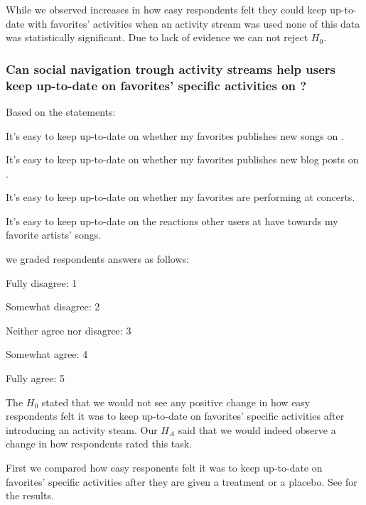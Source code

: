 \parabreak

While we observed increases in how easy respondents felt they could keep
up-to-date with favorites' activities when an activity stream was used none of
this data was statistically significant. Due to lack of evidence we can not
reject $H_0$.

\subsubsection{%
  Can social navigation trough activity streams help users keep
  up-to-date on favorites' specific activities on \urort{}?
}

Based on the statements:
\begin{items}
  \item It's easy to keep up-to-date on whether my favorites publishes
    new songs on \urort{}.
  \item It's easy to keep up-to-date on whether my favorites publishes
    new blog posts on \urort{}.
  \item It's easy to keep up-to-date on whether my favorites are
    performing at concerts.
  \item It's easy to keep up-to-date on the reactions other users at
    \urort{} have towards my favorite artists' songs.
\end{items}

we graded respondents answers as follows:

\begin{items}
  \item Fully disagree: 1
  \item Somewhat disagree: 2
  \item Neither agree nor disagree: 3
  \item Somewhat agree: 4
  \item Fully agree: 5
\end{items}

The $H_0$ stated that we would not see any positive change in how easy
respondents felt it was to keep up-to-date on favorites' specific activities
after introducing an activity steam. Our $H_A$ said that we
would indeed observe a change in how respondents rated this task.

First we compared how easy responents felt it was to keep up-to-date on
favorites' specific activities after they are given a treatment
or a placebo.
See
 for the results.

